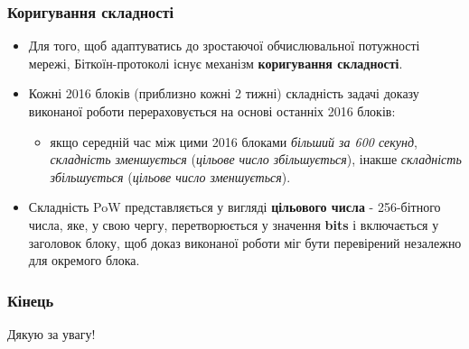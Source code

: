 \documentclass{beamer}
\begin{document}
\begin{frame}
  \frametitle{Коригування складності}
  \begin{itemize}
  \item Для того, щоб адаптуватись до зростаючої обчислювальної потужності
    мережі, Біткоїн-протоколі існує механізм \textbf{коригування складності}.
  \item Кожні 2016 блоків (приблизно кожні 2 тижні) складність задачі доказу
    виконаної роботи перераховується на основі останніх 2016 блоків:
    \begin{itemize}
    \item якщо середній час між цими 2016 блоками \textit{більший за 600
        секунд}, \textit{складність зменшується} (\textit{цільове число
        збільшується}), інакше \textit{складність збільшується} (\textit{цільове
        число зменшується}).
    \end{itemize}
  \item Складність PoW представляється у вигляді \textbf{цільового числа} -
    256-бітного числа, яке, у свою чергу, перетворюється у значення
    \textbf{bits} і включається у заголовок блоку, щоб доказ виконаної роботи
    міг бути перевірений незалежно для окремого блока.
  \end{itemize}
\end{frame}

\begin{frame}
  \frametitle{Кінець}
  \begin{center}
    Дякую за увагу!
  \end{center}
\end{frame}
\end{document}
